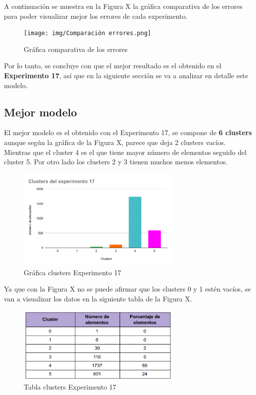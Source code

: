 \documentclass[12pt,a4paper, xcolor=table]{article}
\begin{document}
\vspace{3mm}


A continuación se muestra en la Figura X la gráfica comparativa de los errores para poder visualizar mejor los errores de cada experimento.

\begin{figure}[h]
    \centering
    \texttt{[image: img/Comparación errores.png]}
    \caption{Gráfica comparativa de los errores}
    \label{fig:graf_exp1}
\end{figure}

Por lo tanto, se concluye con que el mejor resultado es el obtenido en el \textbf{Experimento 17}, así que en la siguiente sección se va a analizar en detalle este modelo.

\newpage


\subsection{Mejor modelo}

El mejor modelo es el obtenido con el Experimento 17, se compone de \textbf{6 clusters} aunque según la gráfica de la Figura X, parece que deja 2 clusters vacíos. Mientras que el cluster 4 es el que tiene mayor número de elementos seguido del cluster 5. Por otro lado los clusters 2 y 3 tienen muchos menos elementos.

\begin{figure}[h]
    \centering
    \includegraphics[width=300px]{img/clusters_del_experimento_17.png}
    \caption{Gráfica clusters Experimento 17}
    \label{fig:graf_exp1}
\end{figure}

Ya que con la Figura X no se puede afirmar que los clusters 0 y 1 estén vacíos, se van a visualizar los datos en la siguiente tabla de la Figura X.

\begin{figure}[h]
    \centering
    \includegraphics[width=300px]{img/clusters_mejor_exp.png}
    \caption{Tabla clusters Experimento 17}
    \label{fig:graf_exp1}
\end{figure}
\end{document}
